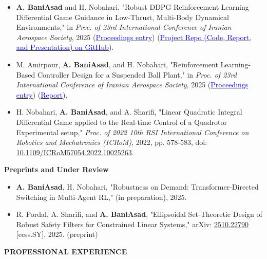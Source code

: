 \documentclass[12pt]{article}
\begin{document}
\begin{itemize} \itemsep -1pt
    \item \textbf{A. BaniAsad} and H. Nobahari, "Robust DDPG Reinforcement Learning Differential Game Guidance in Low-Thrust, Multi-Body Dynamical Environments," in \textit{Proc. of 23rd International Conference of Iranian Aerospace Society}, 2025 (\href{https://civilica.com/doc/2403704/}{\textcolor{blue}{Proceedings entry}}) (\href{https://github.com/alibaniasad1999/DGDDPG}{\textcolor{blue}{Project Repo (Code, Report, and Presentation) on GitHub}}).
    \item M. Amirpour, \textbf{A. BaniAsad}, and H. Nobahari, "Reinforcement Learning-Based Controller Design for a Suspended Ball Plant," in \textit{Proc. of 23rd International Conference of Iranian Aerospace Society}, 2025 (\href{https://civilica.com/doc/2403916/}{\textcolor{blue}{Proceedings entry}}) 
   (\href{https://drive.google.com/file/d/18oinC3TNsnMand_cw5BN_Z3qxRAvds8u/view?usp=sharing}{\textcolor{blue}{Report}}).
	\item H. Nobahari, \textbf{A. BaniAsad}, and A. Sharifi, "Linear Quadratic Integral Differential Game applied to the Real-time Control of a Quadrotor Experimental setup," \textit{Proc. of 2022 10th RSI International Conference on Robotics and Mechatronics (ICRoM)}, 2022, pp. 578-583, doi: \href{https://doi.org/10.1109/ICRoM57054.2022.10025263}{10.1109/ICRoM57054.2022.10025263}.
\end{itemize}

\noindent
{\bfseries Preprints and Under Review}

\begin{itemize} \itemsep -1pt
	\item \textbf{A. BaniAsad}, H. Nobahari, "Robustness on Demand: Transformer-Directed Switching in Multi-Agent RL," (in preparation), 2025. 
	\item R. Pordal, A. Sharifi, and \textbf{A. BaniAsad}, "Ellipsoidal Set-Theoretic Design of Robust Safety Filters for Constrained Linear Systems," arXiv: \href{https://arxiv.org/abs/2510.22790}{2510.22790} [eess.SY], 2025. (preprint)
\end{itemize}


\newpage
\begin{center}
	{\noindent \bfseries PROFESSIONAL EXPERIENCE}
\end{center}
\end{document}
